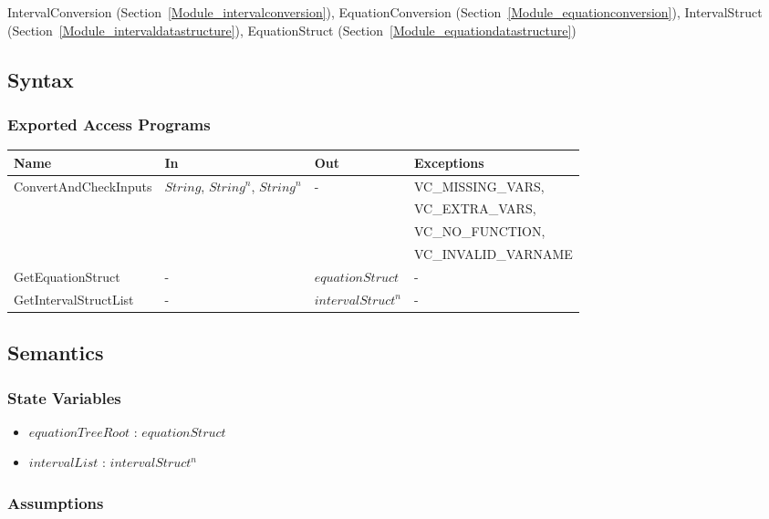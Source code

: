 \documentclass[12pt, titlepage]{article}
\begin{document}
IntervalConversion (Section~\ref{Module_intervalconversion}), 
EquationConversion (Section~\ref{Module_equationconversion}), IntervalStruct 
(Section~\ref{Module_intervaldatastructure}), EquationStruct 
(Section~\ref{Module_equationdatastructure})


\subsection{Syntax}

\subsubsection{Exported Access Programs}

\begin{center}
	\begin{tabular}{p{4.3cm} p{2.3cm} p{3cm} p{5cm}}
		\hline
		\textbf{Name} & \textbf{In} & \textbf{Out} & \textbf{Exceptions} \\
		\hline
		\multirow{4}{4.3cm}{ConvertAndCheckInputs} & 
		\multirow{4}{2.3cm}{$String$, $String^n$, $String^n$} & 
		\multirow{4}{3cm}{-} & VC\_MISSING\_VARS, \\
		& & & VC\_EXTRA\_VARS, \\
		& & & VC\_NO\_FUNCTION, \\
		& & & VC\_INVALID\_VARNAME \\
		GetEquationStruct & - & $equationStruct$ & - \\
		GetIntervalStructList & - & $intervalStruct^n$ & - \\
		\hline
	\end{tabular}
\end{center}

\subsection{Semantics}

\subsubsection{State Variables}

\begin{itemize}
	\item $equationTreeRoot$ : $equationStruct$
	\item $intervalList$ : $intervalStruct^n$
\end{itemize}

\subsubsection{Assumptions}
\end{document}
